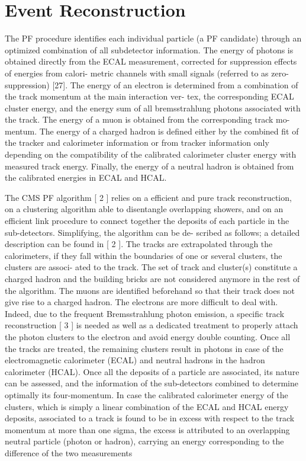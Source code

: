 \documentclass[thesis.tex]{subfiles}
\begin{document}
\chapter{Event Reconstruction}

The PF procedure identifies each individual particle (a PF candidate) through
an optimized combination of all subdetector information.  The energy of photons is obtained
directly from the ECAL measurement, corrected for suppression effects of energies from calori-
metric  channels  with  small  signals  (referred  to  as  zero-suppression)  [27].   The  energy  of  an
electron is determined from a combination of the track momentum at the main interaction ver-
tex, the corresponding ECAL cluster energy, and the energy sum of all bremsstrahlung photons
associated with the track. The energy of a muon is obtained from the corresponding track mo-
mentum.  The energy of a charged hadron is defined either by the combined fit of the tracker
and calorimeter information or from tracker information only depending on the compatibility
of the calibrated calorimeter cluster energy with measured track energy. Finally, the energy of
a neutral hadron is obtained from the calibrated energies in ECAL and HCAL.

The CMS PF algorithm [
2
] relies on a efficient and pure track reconstruction, on a clustering
algorithm able to disentangle overlapping showers, and on an efficient link procedure to connect
together the deposits of each particle in the sub-detectors. Simplifying, the algorithm can be de-
scribed as follows; a detailed description can be found in [
2
]. The tracks are extrapolated through
the calorimeters, if they fall within the boundaries of one or several clusters, the clusters are associ-
ated to the track. The set of track and cluster(s) constitute a charged hadron and the building bricks
are not considered anymore in the rest of the algorithm. The muons are identified beforehand so
that their track does not give rise to a charged hadron. The electrons are more difficult to deal with.
Indeed, due to the frequent Bremsstrahlung photon emission, a specific track reconstruction [
3
]
is needed as well as a dedicated treatment to properly attach the photon clusters to the electron
and avoid energy double counting. Once all the tracks are treated, the remaining clusters result
in photons in case of the electromagnetic calorimeter (ECAL) and neutral hadrons in the hadron
calorimeter (HCAL).
Once all the deposits of a particle are associated, its nature can be assessed, and the information
of the sub-detectors combined to determine optimally its four-momentum. In case the calibrated
calorimeter energy of the clusters, which is simply a linear combination of the ECAL and HCAL
energy deposits, associated to a track is found to be in excess with respect to the track momentum at
more than one sigma, the excess is attributed to an overlapping neutral particle (photon or hadron),
carrying an energy corresponding to the difference of the two measurements
\end{document}
